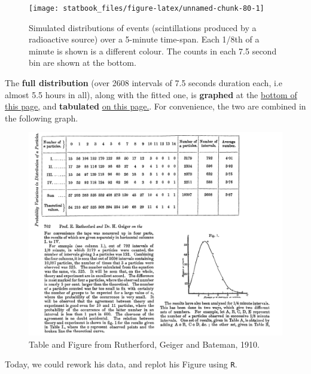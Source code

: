 \documentclass[]{book}
\begin{document}
\begin{figure}

\texttt{[image: statbook\_files/figure-latex/unnamed-chunk-80-1]} \hfill{}

\caption{Simulated  distributions of events (scintillations produced  by a radioactive source) over a 5-minute time-span. Each 1/8th of a minute is shown is a different colour. The counts in each 7.5 second bin are shown at the bottom.}\label{fig:unnamed-chunk-80}
\end{figure}

The \textbf{full distribution} (over 2608 intervals of 7.5 seconds duration each, i.e almost 5.5 hours in all), along with the fitted one, is \textbf{graphed} at the \href{http://www.medicine.mcgill.ca/epidemiology/hanley/bios601/Intensity-Rate/RutherfordGeigerBateman1910.pdf\#page=6}{bottom of this page,} and \textbf{tabulated} \href{http://www.medicine.mcgill.ca/epidemiology/hanley/bios601/Intensity-Rate/RutherfordGeigerBateman1910.pdf\#page=5}{on this page.}. For convenience, the two are combined in the following graph.

\begin{figure}

\includegraphics[width=23.9in]{images/RutherfordTableFig} \hfill{}

\caption{Table and Figure from Rutherford, Geiger and Bateman, 1910.}\label{fig:unnamed-chunk-81}
\end{figure}

Today, we could rework his data, and replot his Figure using \texttt{R}.
\end{document}
